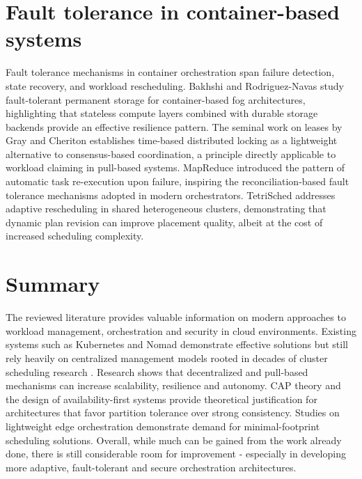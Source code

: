 \section{Fault tolerance in container-based systems}

Fault tolerance mechanisms in container orchestration span failure detection, state recovery, and workload rescheduling. Bakhshi and Rodriguez-Navas \cite{bakhshi2021faulttolerant} study fault-tolerant permanent storage for container-based fog architectures, highlighting that stateless compute layers combined with durable storage backends provide an effective resilience pattern. The seminal work on leases by Gray and Cheriton \cite{gray1989leases} establishes time-based distributed locking as a lightweight alternative to consensus-based coordination, a principle directly applicable to workload claiming in pull-based systems. MapReduce \cite{dean2004mapreduce} introduced the pattern of automatic task re-execution upon failure, inspiring the reconciliation-based fault tolerance mechanisms adopted in modern orchestrators. TetriSched \cite{tumanov2016tetrisched} addresses adaptive rescheduling in shared heterogeneous clusters, demonstrating that dynamic plan revision can improve placement quality, albeit at the cost of increased scheduling complexity.

\section{Summary}

The reviewed literature provides valuable information on modern approaches to workload management, orchestration and security in cloud environments. Existing systems such as Kubernetes and Nomad demonstrate effective solutions but still rely heavily on centralized management models rooted in decades of cluster scheduling research \cite{verma2015borg, schwarzkopf2013omega, hindman2011mesos, vavilapalli2013yarn}. Research shows that decentralized and pull-based mechanisms can increase scalability, resilience and autonomy. CAP theory \cite{brewer2012cap, gilbert2012cap} and the design of availability-first systems \cite{decandia2007dynamo} provide theoretical justification for architectures that favor partition tolerance over strong consistency. Studies on lightweight edge orchestration \cite{cilic2023edgeeval, usman2024lightweight, deng2021fogbus2, arora2022leso} demonstrate demand for minimal-footprint scheduling solutions. Overall, while much can be gained from the work already done, there is still considerable room for improvement - especially in developing more adaptive, fault-tolerant and secure orchestration architectures.
